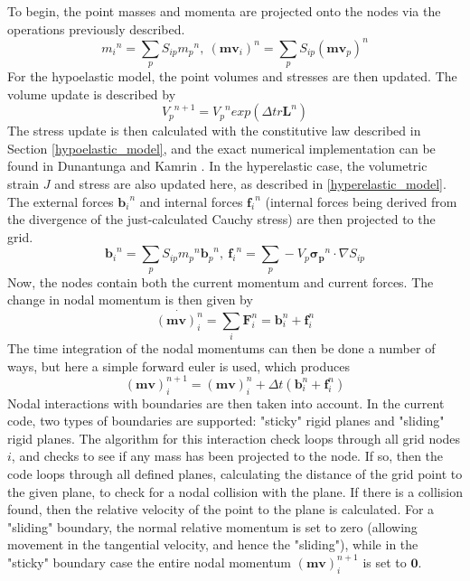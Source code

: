 To begin, the point masses and momenta are projected onto the nodes via the operations previously described. 
\begin{equation}
{m_i}^n=\sum_pS_{ip}{m_p}^n,\ ({{\bm{mv}}_i})^n=\sum_pS_{ip}({{\bm{mv}}_p})^n\label{mass_and_mom_projection}
\end{equation}
For the hypoelastic model, the point volumes and stresses are then updated. The volume update is described by
\begin{equation}
{V_p}^{n+1}={V_p}^n exp(\Delta tr\bm{L}^n) \label{volume_update}
\end{equation}
The stress update is then calculated with the constitutive law described in Section \ref{hypoelastic_model}, and the exact numerical implementation can be found in Dunantunga and Kamrin \cite{Dunatunga:2015:Continuum}. In the hyperelastic case, the volumetric strain $J$ and stress are also updated here, as described in \ref{hyperelastic_model}.
The external forces ${\bm{b}_i}^n$ and internal forces ${\bm{f}_i}^n$ (internal forces being derived from the divergence of the just-calculated Cauchy stress) are then projected to the grid.
\begin{equation}
{\bm{b}_i}^n=\sum_pS_{ip}{m_p}^n{\bm{b}_p}^n,\ {\bm{f}_i}^n=\sum_p -V_p\bm{{\sigma}_p}^n \cdot \nabla S_{ip}
\label{force_projection}
\end{equation}
Now, the nodes contain both the current momentum and current forces. The change in nodal momentum is then given by
\begin{equation}
\dot{(\bm{mv})^n_i}=\sum_{i}\bm{F}^n_i=\bm{b}^n_i+\bm{f}^n_i\label{momentum_rate}
\end{equation}
The time integration of the nodal momentums can then be done a number of ways, but here a simple forward euler is used, which produces
\begin{equation}
(\bm{mv})^{n+1}_i=(\bm{mv})^n_i+\Delta t(\bm{b}^n_i+\bm{f}^n_i)
\end{equation}
Nodal interactions with boundaries are then taken into account. In the current code, two types of boundaries are supported: "sticky" rigid planes and "sliding" rigid planes. The algorithm for this interaction check loops through all grid nodes $i$, and checks to see if any mass has been projected to the node. If so, then the code loops through all defined planes, calculating the distance of the grid point to the given plane, to check for a nodal collision with the plane. If there is a collision found, then the relative velocity of the point to the plane is calculated. For a "sliding" boundary, the normal relative momentum is set to zero (allowing movement in the tangential velocity, and hence the "sliding"), while in the "sticky" boundary case the entire nodal momentum $(\bm{mv})^{n+1}_i$ is set to $\bm{0}$.


